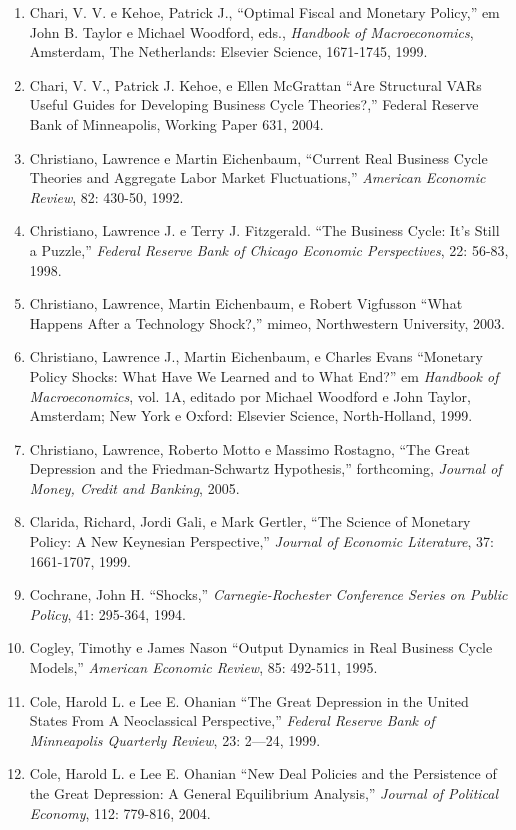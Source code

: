 \documentclass[12pt]{article}
\begin{document}
\begin{enumerate}
    \item Chari, V. V. e Kehoe, Patrick J., “Optimal Fiscal and Monetary Policy,” em John B. Taylor e Michael Woodford, eds., \textit{Handbook of Macroeconomics}, Amsterdam, The Netherlands: Elsevier Science, 1671-1745, 1999.
    \item Chari, V. V., Patrick J. Kehoe, e Ellen McGrattan “Are Structural VARs Useful Guides for Developing Business Cycle Theories?,” Federal Reserve Bank of Minneapolis, Working Paper 631, 2004.
    \item Christiano, Lawrence e Martin Eichenbaum, “Current Real Business Cycle Theories and Aggregate Labor Market Fluctuations,” \textit{American Economic Review}, 82: 430-50, 1992.
    \item Christiano, Lawrence J. e Terry J. Fitzgerald. “The Business Cycle: It’s Still a Puzzle,” \textit{Federal Reserve Bank of Chicago Economic Perspectives}, 22: 56-83, 1998.
    \item Christiano, Lawrence, Martin Eichenbaum, e Robert Vigfusson “What Happens After a Technology Shock?,” mimeo, Northwestern University, 2003.
    \item Christiano, Lawrence J., Martin Eichenbaum, e Charles Evans “Monetary Policy Shocks: What Have We Learned and to What End?” em \textit{Handbook of Macroeconomics}, vol. 1A, editado por Michael Woodford e John Taylor, Amsterdam; New York e Oxford: Elsevier Science, North-Holland, 1999.
    \item Christiano, Lawrence, Roberto Motto e Massimo Rostagno, “The Great Depression and the Friedman-Schwartz Hypothesis,” forthcoming, \textit{Journal of Money, Credit and Banking}, 2005.
    \item Clarida, Richard, Jordi Gali, e Mark Gertler, “The Science of Monetary Policy: A New Keynesian Perspective,” \textit{Journal of Economic Literature}, 37: 1661-1707, 1999.
    \item Cochrane, John H. “Shocks,” \textit{Carnegie-Rochester Conference Series on Public Policy}, 41: 295-364, 1994.
    \item Cogley, Timothy e James Nason “Output Dynamics in Real Business Cycle Models,” \textit{American Economic Review}, 85: 492-511, 1995.
    \item Cole, Harold L. e Lee E. Ohanian “The Great Depression in the United States From A Neoclassical Perspective,” \textit{Federal Reserve Bank of Minneapolis Quarterly Review}, 23: 2—24, 1999.
    \item Cole, Harold L. e Lee E. Ohanian “New Deal Policies and the Persistence of the Great Depression: A General Equilibrium Analysis,” \textit{Journal of Political Economy}, 112: 779-816, 2004.

\end{enumerate}
\end{document}
